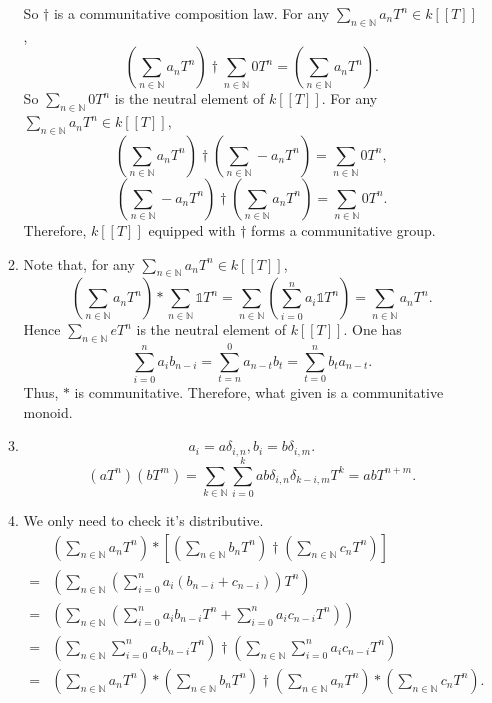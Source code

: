 \documentclass[12pt]{article}
\newcommand{\NN}{\mathbb{N}}
\begin{document}
\begin{enumerate}
\begin{enumerate}
            So $\dagger$ is a communitative composition law.
            \newline
            For any $\sum_{n\in \NN}a_nT^n\in k[[T]]$,
            $$\left(\sum_{n\in \NN}a_nT^n\right)\dagger\sum_{n\in \NN}0T^n=\left(\sum_{n\in \NN}a_nT^n\right).$$
            So $\sum_{n\in\NN}0T^n$ is the neutral element of $k[[T]]$.
            \newline
            For any $\sum_{n\in \NN}a_nT^n\in k[[T]]$,
            $$\left(\sum_{n\in \NN}a_nT^n\right)\dagger\left(\sum_{n\in \NN}-a_nT^n\right)=\sum_{n\in \NN}0T^n,$$
            $$\left(\sum_{n\in \NN}-a_nT^n\right)\dagger\left(\sum_{n\in \NN}a_nT^n\right)=\sum_{n\in \NN}0T^n.$$
            Therefore, $k[[T]]$ equipped with $\dagger$ forms a communitative group.
            \item Note that, for any $\sum_{n\in \NN}a_nT^n\in k[[T]]$,
            $$\left(\sum_{n\in \NN}a_nT^n\right)*\sum_{n\in \NN}\mathds{1}T^n=\sum_{n\in \NN}\left(\sum_{i=0}^{n}a_i\mathds{1}T^{n}\right)=\sum_{n\in \NN}a_nT^n.$$
            Hence $\sum_{n\in \NN}eT^n$ is the neutral element of $k[[T]]$. One has 
            $$\sum_{i=0}^{n}a_ib_{n-i}=\sum_{t=n}^{0}a_{n-t}b_t=\sum_{t=0}^{n}b_ta_{n-t}.$$
            Thus, $*$ is communitative. Therefore, what given is a communitative monoid.
            \item $$a_i=a\delta_{i,n}, b_i=b\delta_{i,m}.$$
                $$(aT^n)(bT^m)=\sum_{k\in \NN}\sum_{i=0}^{k}ab\delta_{i,n}\delta_{k-i,m}T^k=abT^{n+m}.$$
            \item We only need to check it's distributive.
                \begin{align*}
                     &\left(\sum_{n\in \NN}a_nT^n\right)*\left[\left(\sum_{n\in \NN}b_nT^n\right)\dagger\left(\sum_{n\in \NN}c_nT^n\right)\right]\\
                    =&\left(\sum_{n\in \NN}\left(\sum_{i=0}^{n}a_i(b_{n-i}+c_{n-i})\right)T^n\right)\\
                    =&\left(\sum_{n\in \NN}\left(\sum_{i=0}^{n}a_ib_{n-i}T^n+\sum_{i=0}^{n}a_ic_{n-i}T^n\right)\right)\\
                    =&\left(\sum_{n\in \NN}\sum_{i=0}^{n}a_ib_{n-i}T^n\right)\dagger\left(\sum_{n\in \NN}\sum_{i=0}^{n}a_ic_{n-i}T^n\right)\\
                    =&\left(\sum_{n\in \NN}a_nT^n\right)*\left(\sum_{n\in \NN}b_nT^n\right)\dagger\left(\sum_{n\in \NN}a_nT^n\right)*\left(\sum_{n\in \NN}c_nT^n\right).
                \end{align*}

\end{enumerate}
\end{enumerate}
\end{document}
